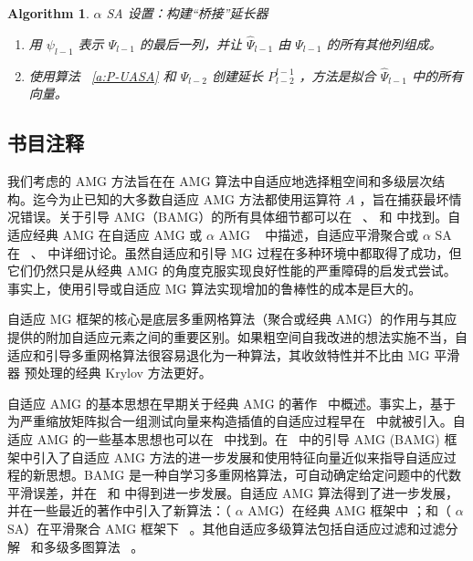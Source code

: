 \documentclass[12pt]{acta_2011xz}
\newtheorem{algorithm}[equation]{Algorithm}
\begin{document}
   \begin{algorithm}   \caption{   $\alpha$    SA 设置：构建“桥接”延长器    \label{a:bridge}     }    
   \begin{enumerate}

    \item   用          $\psi_{l-1}$          表示          $\Psi_{l-1}$          的最后一列，并让          $\hat{\Psi}_{l-1}$          由          $\Psi_{l-1}$          的所有其他列组成。   \item   使用算法~   \ref{a:P-UASA}    和 
         $\Psi_{l-2}$          创建延长          $P_{l-2}^{l-1}$         ，方法是拟合          $\hat{\Psi}_{l-1}$          中的所有向量。  \end{enumerate}     \end{algorithm}     

   \subsection{书目注释  }       \label{s:biblio-adaptive}    我们考虑的 AMG 方法旨在在 AMG 算法中自适应地选择粗空间和多级层次结构。迄今为止已知的大多数自适应 AMG 方法都使用运算符    $A$   ，旨在捕获最坏情况错误。关于引导 AMG（BAMG）的所有具体细节都可以在~    \cite{original_BS}   、
   \cite{BS_2011}    和    \cite{BS_2015}    中找到。自适应经典 AMG 在自适应 AMG 或    $\alpha$    AMG ~    \cite{aAMG}    中描述，自适应平滑聚合或    $\alpha$    SA 在~    \cite{aSA}   、   \cite{aSAM}    中详细讨论。虽然自适应和引导 MG 过程在多种环境中都取得了成功，但它们仍然只是从经典 AMG 的角度克服实现良好性能的严重障碍的启发式尝试。事实上，使用引导或自适应 MG 算法实现增加的鲁棒性的成本是巨大的。  

自适应 MG 框架的核心是底层多重网格算法（聚合或经典 AMG）的作用与其应提供的附加自适应元素之间的重要区别。如果粗空间自我改进的想法实施不当，自适应和引导多重网格算法很容易退化为一种算法，其收敛特性并不比由 MG 平滑器    \cite{Falgout.R.2004a}    预处理的经典 Krylov 方法更好。  

自适应 AMG 的基本思想在早期关于经典 AMG 的著作~    \cite{1stAMG}    中概述。事实上，基于为严重缩放矩阵拟合一组测试向量来构造插值的自适应过程早在~    \cite{ruge1983algebraic}    中就被引入。自适应 AMG 的一些基本思想也可以在~    \cite{ruge5110final,ruge1986amg,mccormick1989algebraic,Brandt.A;McCormick.S;Ruge.J.1985a}    中找到。在~    \cite{Brandt.A.2001a}    中的引导 AMG (BAMG) 框架中引入了自适应 AMG 方法的进一步发展和使用特征向量近似来指导自适应过程的新思想。BAMG 是一种自学习多重网格算法，可自动确定给定问题中的代数平滑误差，并在~    \cite{BS_2011}    和    \cite{BS_2015}    中得到进一步发展。自适应 AMG 算法得到了进一步发展，并在一些最近的著作中引入了新算法：（   $\alpha$    AMG）在经典 AMG 框架中
   \cite{Brezina.M;Falgout.R;MacLachlan.S;Manteuffel.T;McCormick.S;Ruge.J.2006b}   ；和（   $\alpha$    SA）在平滑聚合 AMG 框架下~    \cite{Brezina.M;Falgout.R;MacLachlan.S;Manteuffel.T;McCormick.S;Ruge.J.2004a,Brezina.M;Falgout.R;Maclachlan.S;Manteuffel.T;Mccormick.S;Ruge.J.2005a}    。其他自适应多级算法包括自适应过滤和过滤分解~    \cite{1992WittumG-aa,1997WagnerC_WittumG-aa}    和多级多图算法~    \cite{2002BankR_SmithR-aa}    。  
\end{document}
